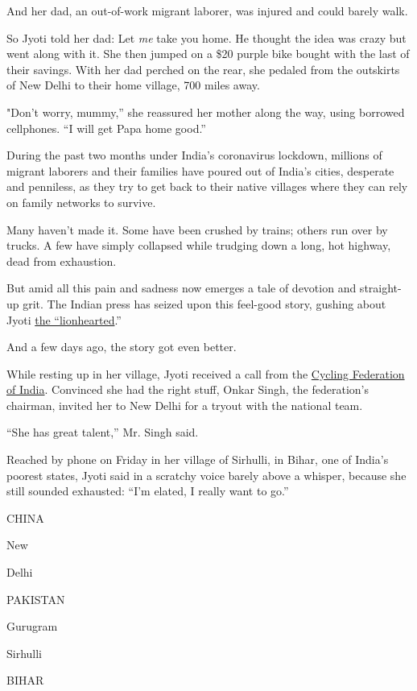 And her dad, an out-of-work migrant laborer, was injured and could
barely walk.

So Jyoti told her dad: Let \emph{me} take you home. He thought the idea
was crazy but went along with it. She then jumped on a \$20 purple bike
bought with the last of their savings. With her dad perched on the rear,
she pedaled from the outskirts of New Delhi to their home village, 700
miles away.

"Don't worry, mummy,'' she reassured her mother along the way, using
borrowed cellphones. ``I will get Papa home good.''

During the past two months under India's coronavirus lockdown, millions
of migrant laborers and their families have poured out of India's
cities, desperate and penniless, as they try to get back to their native
villages where they can rely on family networks to survive.

Many haven't made it. Some have been crushed by trains; others run over
by trucks. A few have simply collapsed while trudging down a long, hot
highway, dead from exhaustion.

But amid all this pain and sadness now emerges a tale of devotion and
straight-up grit. The Indian press has seized upon this feel-good story,
gushing about Jyoti
\href{https://www.dnaindia.com/lifestyle/report-she-is-indeed-my-shravan-kumar-15-year-old-girl-brings-father-from-gurugram-to-bihar-on-bicycle-2825465}{the
``lionhearted}.''

And a few days ago, the story got even better.

While resting up in her village, Jyoti received a call from the
\href{http://www.cyclingfederationofindia.org/about.html}{Cycling
Federation of India}. Convinced she had the right stuff, Onkar Singh,
the federation's chairman, invited her to New Delhi for a tryout with
the national team.

``She has great talent,'' Mr. Singh said.

Reached by phone on Friday in her village of Sirhulli, in Bihar, one of
India's poorest states, Jyoti said in a scratchy voice barely above a
whisper, because she still sounded exhausted: ``I'm elated, I really
want to go.''

CHINA

New

Delhi

PAKISTAN

Gurugram

Sirhulli

BIHAR

